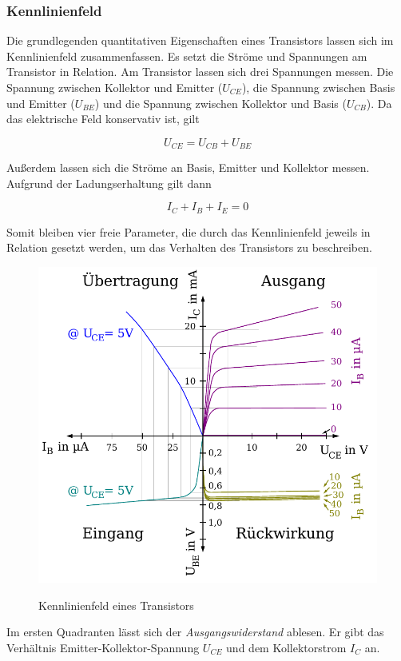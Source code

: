 \subsubsection{Kennlinienfeld}

Die grundlegenden quantitativen Eigenschaften eines Transistors lassen sich im
Kennlinienfeld zusammenfassen. Es setzt die Ströme und Spannungen am Transistor
in Relation. Am Transistor lassen sich drei Spannungen messen. Die Spannung
zwischen Kollektor und Emitter ($U_{CE}$), die Spannung zwischen Basis und
Emitter ($U_{BE}$) und die Spannung zwischen Kollektor und Basis ($U_{CB}$). Da
das elektrische Feld konservativ ist, gilt

\begin{equation}
  U_{CE} = U_{CB} + U_{BE}
\end{equation}

Außerdem lassen sich die Ströme an Basis, Emitter und Kollektor messen.
Aufgrund der Ladungserhaltung gilt dann

\begin{equation}
  I_C + I_B + I_E = 0
\end{equation}

Somit bleiben vier freie Parameter, die durch das Kennlinienfeld jeweils in
Relation gesetzt werden, um das Verhalten des Transistors zu beschreiben.

\begin{figure}[H]
  \centering
  \includegraphics[width=.6\textwidth]{kennlinienfeld.pdf}
  \label{img:kennlinie}
  \caption{Kennlinienfeld eines Transistors}
\end{figure}

Im ersten Quadranten lässt sich der \textit{Ausgangswiderstand} ablesen. Er
gibt das Verhältnis Emitter-Kollektor-Spannung $U_{CE}$ und dem Kollektorstrom
$I_C$ an.

